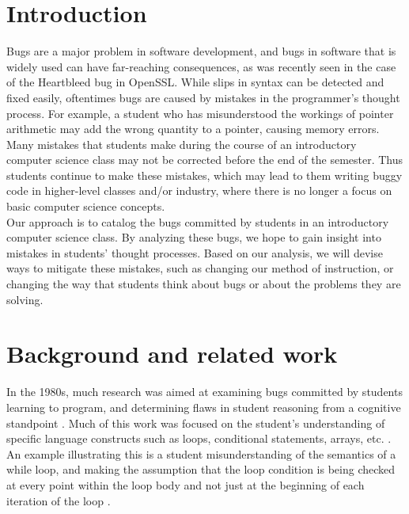\documentclass{sig-alternate}
\begin{document}
\section{Introduction}
\label{sec:intro}

Bugs are a major problem in software development, and bugs in software that is widely used can have far-reaching consequences, as was recently seen in the case of the Heartbleed bug in OpenSSL. While slips in syntax can be detected and fixed easily, oftentimes bugs are caused by mistakes in the programmer's thought process. For example, a student who has misunderstood the workings of pointer arithmetic may add the wrong quantity to a pointer, causing memory errors.\\

Many mistakes that students make during the course of an introductory computer science class may not be corrected before the end of the semester. Thus students continue to make these mistakes, which may lead to them writing buggy code in higher-level classes and/or industry, where there is no longer a focus on basic computer science concepts.\\

Our approach is to catalog the bugs committed by students in an introductory computer science class. By analyzing these bugs, we hope to gain insight into mistakes in students' thought processes. Based on our analysis, we will devise ways to mitigate these mistakes, such as changing our method of instruction, or changing the way that students think about bugs or about the problems they are solving.

\section{Background and related work}
\label{sec:background}

In the 1980s, much research was aimed at examining bugs committed by students learning to program, and determining flaws in student reasoning from a cognitive standpoint \cite{JoniSolowayGoldmanEhrlich83, PutnamSleemanBaxterKuspa86, SpohrerSoloway86, Pea86}. Much of this work was focused on the student's understanding of specific language constructs such as loops, conditional statements, arrays, etc. \cite{JoniSolowayGoldmanEhrlich83, PutnamSleemanBaxterKuspa86, Pea86}. An example illustrating this is a student misunderstanding of the semantics of a while loop, and making the assumption that the loop condition is being checked at every point within the loop body and not just at the beginning of each iteration of the loop \cite{Pea86}.\\
\end{document}
